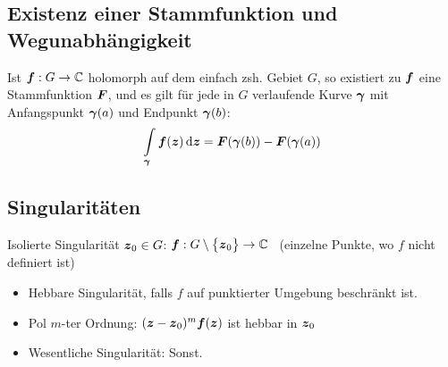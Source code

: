 \documentclass[german,color,5pt]{latex4ei/latex4ei_fs}
\begin{document}
\begin{sectionbox}
	\subsection{Existenz einer Stammfunktion und Wegunabhängigkeit}
	Ist $\boldsymbol{f}: G \rightarrow \mathbb C$ holomorph auf dem einfach zsh. Gebiet $G$, so existiert zu $\boldsymbol{f}$ eine Stammfunktion $\boldsymbol{F}$, und es gilt für jede in $G$ verlaufende Kurve $\boldsymbol{\gamma}$ mit Anfangspunkt $\boldsymbol{\gamma}(a)$ und Endpunkt $\boldsymbol{\gamma}(b)$: \\
	\begin{equation*}
		\int \limits_{\cx \gamma} \cx f(\cx z) \diff \cx z = \cx F(\cx \gamma (b)) - \cx F(\cx \gamma (a))
	\end{equation*}
\end{sectionbox}

\begin{sectionbox}
	\subsection{Singularitäten}
	Isolierte Singularität $\boldsymbol{z}_0\in G$: \quad $\boldsymbol{f} :G \setminus \bigl\{\boldsymbol{z}_0\bigr\} \rightarrow \mathbb C$ \ (einzelne Punkte, wo $f$ nicht definiert ist)
	\begin{itemize}
		\item Hebbare Singularität, falls $f$ auf punktierter Umgebung beschränkt ist.
		\item Pol $m$-ter Ordnung: $(\boldsymbol{z} - \boldsymbol{z}_0)^m \boldsymbol{f}(\boldsymbol{z})$ ist hebbar in $\boldsymbol{z}_0$
		\item Wesentliche Singularität: Sonst.
	\end{itemize}
\end{sectionbox}
\end{document}
